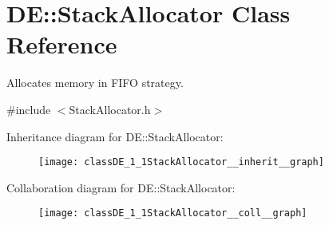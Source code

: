 \hypertarget{classDE_1_1StackAllocator}{}\section{DE\+:\+:Stack\+Allocator Class Reference}
\label{classDE_1_1StackAllocator}


Allocates memory in F\+I\+FO strategy.  




{\ttfamily \#include $<$Stack\+Allocator.\+h$>$}



Inheritance diagram for DE\+:\+:Stack\+Allocator\+:\nopagebreak
\begin{figure}[H]
\begin{center}
\leavevmode
\texttt{[image: classDE\_1\_1StackAllocator\_\_inherit\_\_graph]}
\end{center}
\end{figure}


Collaboration diagram for DE\+:\+:Stack\+Allocator\+:\nopagebreak
\begin{figure}[H]
\begin{center}
\leavevmode
\texttt{[image: classDE\_1\_1StackAllocator\_\_coll\_\_graph]}
\end{center}
\end{figure}
